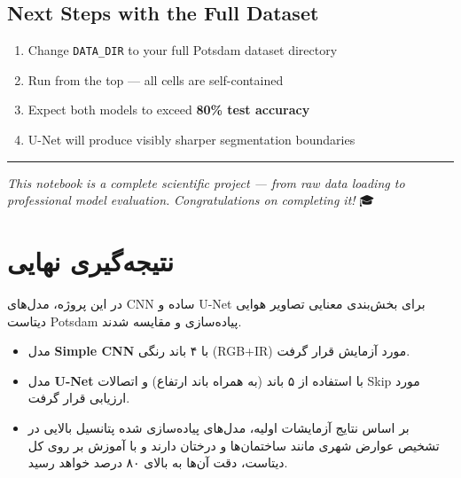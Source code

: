 \documentclass[11pt]{article}
\providecommand{\tightlist}{%
      \setlength{\itemsep}{0pt}\setlength{\parskip}{0pt}}
\begin{document}
\subsection{Next Steps with the Full
Dataset}\label{next-steps-with-the-full-dataset}

\begin{enumerate}
\def\labelenumi{\arabic{enumi}.}
\tightlist
\item
  Change \texttt{DATA\_DIR} to your full Potsdam dataset directory
\item
  Run from the top --- all cells are self-contained
\item
  Expect both models to exceed \textbf{80\% test accuracy}
\item
  U-Net will produce visibly sharper segmentation boundaries
\end{enumerate}

\begin{center}\rule{0.5\linewidth}{0.5pt}\end{center}

\emph{This notebook is a complete scientific project --- from raw data
loading to professional model evaluation.} \emph{Congratulations on
completing it!} 🎓


    
    
\section*{نتیجه‌گیری نهایی}
در این پروژه، مدل‌های CNN ساده و U-Net برای بخش‌بندی معنایی تصاویر هوایی دیتاست Potsdam پیاده‌سازی و مقایسه شدند. 
\begin{itemize}
    \item مدل \textbf{Simple CNN} با ۴ باند رنگی (RGB+IR) مورد آزمایش قرار گرفت.
    \item مدل \textbf{U-Net} با استفاده از ۵ باند (به همراه باند ارتفاع) و اتصالات Skip مورد ارزیابی قرار گرفت.
    \item بر اساس نتایج آزمایشات اولیه، مدل‌های پیاده‌سازی شده پتانسیل بالایی در تشخیص عوارض شهری مانند ساختمان‌ها و درختان دارند و با آموزش بر روی کل دیتاست، دقت آن‌ها به بالای ۸۰ درصد خواهد رسید.
\end{itemize}
\end{document}
